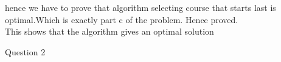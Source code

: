 \documentclass{extarticle}
\theoremstyle{remark}
\begin{document}
hence we have to prove that algorithm selecting course that starts last is optimal.Which is exactly part c of the problem. Hence proved. \\

This  shows that the algorithm gives an optimal solution
\newpage






















\newpage


\Large{Question 2}\\
\normalsize
\end{document}
